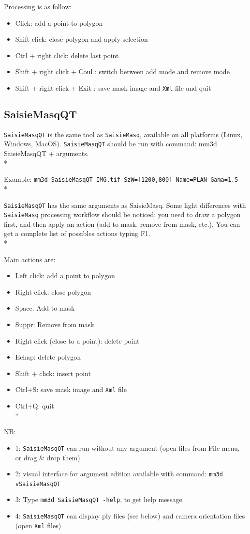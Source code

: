 Processing is as follow:
\begin{itemize}
\item Click: add a point to polygon
\item Shift click: close polygon and apply selection
\item Ctrl + right click: delete last point
\item Shift + right click + Coul : switch between add mode and remove mode
\item Shift + right click + Exit : save mask image and {\tt Xml} file and quit
\end{itemize}

\subsection{SaisieMasqQT}

{\tt SaisieMasqQT} is the same tool as {\tt SaisieMasq}, available on all platforms (Linux, Windows, MacOS).
{\tt SaisieMasqQT} should be run with command: mm3d SaisieMasqQT + arguments.\\*

Example: {\tt mm3d SaisieMasqQT IMG.tif SzW=[1200,800] Name=PLAN Gama=1.5}\\*

{\tt SaisieMasqQT} has the same arguments as SaisieMasq. Some light differences with {\tt SaisieMasq} processing workflow should be noticed:
you need to draw a polygon first, and then apply an action (add to mask, remove from mask, etc.).
You can get a complete list of possibles actions typing F1.\\*

Main actions are:
\begin{itemize}
\item Left click: add a point to polygon
\item Right click: close polygon
\item Space: Add to mask
\item Suppr: Remove from mask
\item Right click (close to a point): delete point
\item Echap: delete polygon
\item Shift + click: insert point
\item Ctrl+S: save mask image and {\tt Xml} file
\item Ctrl+Q: quit\\*
\end{itemize}

NB:
\begin{itemize}
\item 1: {\tt SaisieMasqQT} can run without any argument (open files from File menu, or drag \& drop them)
\item 2: visual interface for argument edition available with command: {\tt mm3d vSaisieMasqQT}
\item 3: Type {\tt mm3d SaisieMasqQT -help}, to get help message.
\item 4: {\tt SaisieMasqQT} can display ply files (see below) and camera orientation files (open {\tt Xml} files)
\end{itemize}

